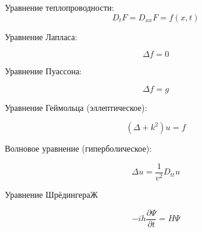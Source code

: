 

Уравнение теплопроводности:
$$ D_t F = D_{xx} F = f(x,t) $$

Уравнение Лапласа:

$$ \Delta f = 0 $$

Уравнение Пуассона:

$$ \Delta f = g $$

Уравнение Геймольца (эллептическое):

$$ (\Delta + k^2) u = f $$

Волновое уравнение (гиперболическое):

$$ \Delta u = \frac{1}{v^2} D_{tt} u $$

Уравнение ШрёдингераЖ

$$ -i h \frac{\partial \Psi}{\partial t} = H \Psi $$





